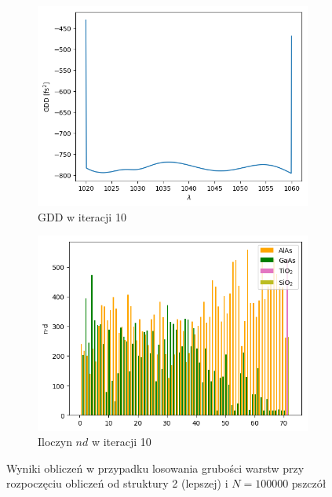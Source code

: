 \begin{figure} [H]
\begin{subfigure}[b]{0.31\textwidth}
        \includegraphics[width=\linewidth]{figures/wyniki/losowe/dbr_opt10/result_gddresult10.png}
        \caption{GDD w iteracji 10}
    \end{subfigure}
        \begin{subfigure}[b]{0.32\textwidth}
        \includegraphics[width=\linewidth]{figures/wyniki/losowe/dbr_opt10/result_ndresult10.png}
        \caption{Iloczyn $nd$ w iteracji 10}
    \end{subfigure}
    \caption{Wyniki obliczeń w przypadku losowania grubości warstw przy rozpoczęciu obliczeń od struktury 2 (lepszej) i $N = 100000$ pszczół}
    \label{fig:wynlos3}
\end{figure}

